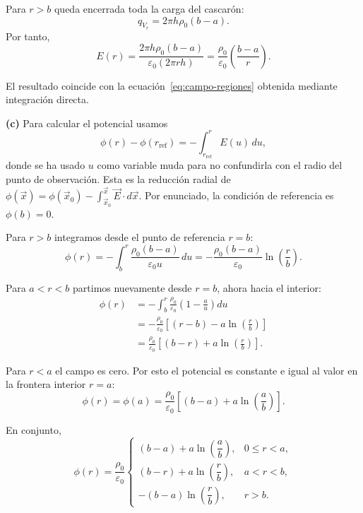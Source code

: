\documentclass[11pt]{article}
\newcommand{\inciso}[1]{%
  \vspace{0.35em}
  \noindent\textbf{(#1)}\enspace}
\begin{document}
Para $r>b$ queda encerrada toda la carga del cascarón:
\begin{equation}
q_{V_r}=2\pi h\rho_0(b-a).
\end{equation}
Por tanto,
\begin{equation}
E(r)=\frac{2\pi h\rho_0(b-a)}
{\varepsilon_0(2\pi r h)}
=\frac{\rho_0}{\varepsilon_0}\left(\frac{b-a}{r}\right).
\end{equation}

El resultado coincide con la ecuación~\eqref{eq:campo-regiones} obtenida mediante
integración directa.

\inciso{c} Para calcular el potencial usamos
\begin{equation}
\phi(r)-\phi(r_{\mathrm{ref}})
=-\int_{r_{\mathrm{ref}}}^{r}E(u)\,du,
\end{equation}
donde se ha usado $u$ como variable muda para no confundirla con el radio del punto
de observación. Esta es la reducción radial de
$\phi(\vec{x})=\phi(\vec{x}_0)-\int_{\vec{x}_0}^{\vec{x}}\vec E\cdot d\vec{x}$.
Por enunciado, la condición de referencia es $\phi(b)=0$.

Para $r>b$ integramos desde el punto de referencia $r=b$:
\begin{equation}
\phi(r)=-\int_b^r\frac{\rho_0(b-a)}{\varepsilon_0u}\,du
=-\frac{\rho_0(b-a)}{\varepsilon_0}\ln\left(\frac{r}{b}\right).
\end{equation}

Para $a<r<b$ partimos nuevamente desde $r=b$, ahora hacia el interior:
\begin{equation}
\begin{aligned}
\phi(r)
&=-\int_b^r\frac{\rho_0}{\varepsilon_0}
\left(1-\frac{a}{u}\right)du\\
&=-\frac{\rho_0}{\varepsilon_0}
\left[(r-b)-a\ln\left(\frac{r}{b}\right)\right]\\
&=\frac{\rho_0}{\varepsilon_0}
\left[(b-r)+a\ln\left(\frac{r}{b}\right)\right].
\end{aligned}
\end{equation}

Para $r<a$ el campo es cero. Por esto el potencial es constante e igual al
valor en la frontera interior $r=a$:
\begin{equation}
\phi(r)=\phi(a)=\frac{\rho_0}{\varepsilon_0}
\left[(b-a)+a\ln\left(\frac{a}{b}\right)\right].
\end{equation}

En conjunto,
\begin{equation}
\boxed{
\phi(r)=\frac{\rho_0}{\varepsilon_0}
\begin{cases}
(b-a)+a\ln\left(\dfrac{a}{b}\right), & 0\leq r<a,\\[7pt]
(b-r)+a\ln\left(\dfrac{r}{b}\right), & a<r<b,\\[7pt]
-(b-a)\ln\left(\dfrac{r}{b}\right), & r>b.
\end{cases}}
\end{equation}
\end{document}
